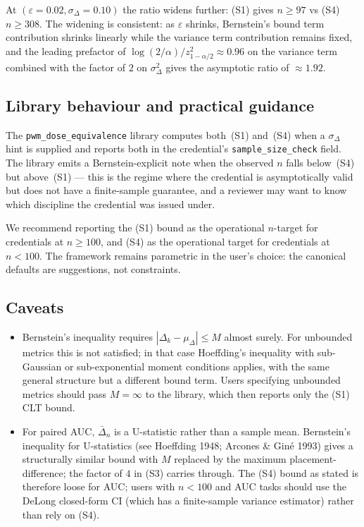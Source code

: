 \documentclass[twoside,11pt]{article}
\begin{document}
At $(\varepsilon = 0.02, \sigma_\Delta = 0.10)$ the ratio widens further: (S1) gives $n \geq 97$ vs (S4) $n \geq 308$. The widening is consistent: as $\varepsilon$ shrinks, Bernstein's bound term contribution shrinks linearly while the variance term contribution remains fixed, and the leading prefactor of $\log(2/\alpha) / z_{1-\alpha/2}^2 \approx 0.96$ on the variance term combined with the factor of $2$ on $\sigma_\Delta^2$ gives the asymptotic ratio of $\approx 1.92$.

\subsection{Library behaviour and practical guidance}

The \texttt{pwm\_dose\_equivalence} library computes both~(S1) and~(S4) when a $\sigma_\Delta$ hint is supplied and reports both in the credential's \texttt{sample\_size\_check} field. The library emits a Bernstein-explicit note when the observed $n$ falls below~(S4) but above~(S1) --- this is the regime where the credential is asymptotically valid but does not have a finite-sample guarantee, and a reviewer may want to know which discipline the credential was issued under.

We recommend reporting the (S1) bound as the operational $n$-target for credentials at $n \geq 100$, and (S4) as the operational target for credentials at $n < 100$. The framework remains parametric in the user's choice: the canonical defaults are suggestions, not constraints.

\subsection{Caveats}

\begin{itemize}
    \item Bernstein's inequality requires $|\Delta_k - \mu_\Delta| \leq M$ almost surely. For unbounded metrics this is not satisfied; in that case Hoeffding's inequality with sub-Gaussian or sub-exponential moment conditions applies, with the same general structure but a different bound term. Users specifying unbounded metrics should pass $M = \infty$ to the library, which then reports only the (S1) CLT bound.
    \item For paired AUC, $\bar\Delta_n$ is a U-statistic rather than a sample mean. Bernstein's inequality for U-statistics (see Hoeffding 1948; Arcones \& Giné 1993) gives a structurally similar bound with $M$ replaced by the maximum placement-difference; the factor of $4$ in (S3) carries through. The (S4) bound as stated is therefore loose for AUC; users with $n < 100$ and AUC tasks should use the DeLong closed-form CI (which has a finite-sample variance estimator) rather than rely on (S4).
\end{itemize}
\end{document}
